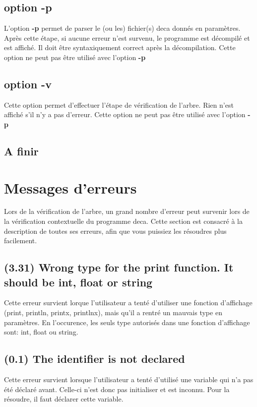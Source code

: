 \documentclass[12pt, a4paper, one side]{article}
\begin{document}
\subsection{option -p}

L'option \textbf{-p} permet de parser le (ou les) fichier(s) deca donnés en paramètres.
Après cette étape, si aucune erreur n'est survenu, le programme est décompilé et est
affiché. Il doit être syntaxiquement correct après la décompilation. Cette option ne peut
pas être utilisé avec l'option \textbf{-p}

\subsection{option -v}

Cette option permet d'effectuer l'étape de vérification de l'arbre. Rien n'est affiché s'il
n'y a pas d'erreur. Cette option ne peut pas être utilisé avec l'option \textbf{-p}

\subsection{A finir }

\section{Messages d'erreurs}

Lors de la vérification de l'arbre, un grand nombre d'erreur peut survenir lors de la vérification
contextuelle du programme deca. Cette section est consacré à la description de toutes ses erreurs,
afin que vous puissiez les résoudres plus facilement.

\subsection{(3.31) Wrong type for the print function. It should be int, float or string}

Cette erreur survient lorque l'utilisateur a tenté d'utiliser une fonction d'affichage (print, println, printx, printlnx),
mais qu'il a rentré un mauvais type en paramètres. En l'occurence, les seuls type autorisés dans une
fonction d'affichage sont: int, float ou string.

\subsection{(0.1) The identifier is not declared}

Cette erreur survient lorsque l'utilisateur a tenté d'utilisé une variable qui n'a pas été déclaré avant. Celle-ci n'est donc
pas initialiser et est inconnu. Pour la résoudre, il faut déclarer cette variable.
\end{document}
